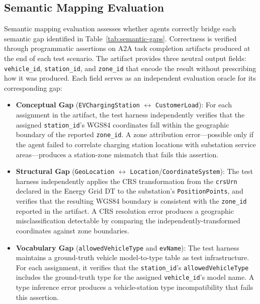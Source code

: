 \subsection{Semantic Mapping Evaluation}
\label{subsec:semantic-mapping-evaluation}

Semantic mapping evaluation assesses whether agents correctly bridge each semantic gap
    identified in Table~\ref{tab:semantic-gaps}.
Correctness is verified through programmatic assertions on A2A task completion artifacts
    produced at the end of each test scenario.
The artifact provides three neutral output fields: \texttt{vehicle\_id},
    \texttt{station\_id}, and \texttt{zone\_id} that encode the result
    without prescribing how it was produced.
Each field serves as an independent evaluation oracle for its corresponding gap:

\begin{itemize}
    \item \textbf{Conceptual Gap}
        (\texttt{EVChargingStation} $\leftrightarrow$ \texttt{CustomerLoad}):
    For each assignment in the artifact, the test harness independently verifies
        that the assigned \texttt{station\_id}'s WGS84 coordinates
        fall within the geographic boundary of the reported \texttt{zone\_id}.
    A zone attribution error---possible only if the agent failed to correlate
        charging station locations with substation service areas---produces
        a station-zone mismatch that fails this assertion.

    \item \textbf{Structural Gap}
        (\texttt{GeoLocation} $\leftrightarrow$ \texttt{Location}/\texttt{CoordinateSystem}):
    The test harness independently applies the CRS transformation from the
        \texttt{crsUrn} declared in the Energy Grid DT
        to the substation's \texttt{PositionPoints},
        and verifies that the resulting WGS84 boundary is consistent with
        the \texttt{zone\_id} reported in the artifact.
    A CRS resolution error produces a geographic misclassification
        detectable by comparing the independently-transformed coordinates
        against zone boundaries.

    \item \textbf{Vocabulary Gap}
        (\texttt{allowedVehicleType} and \texttt{evName}):
    The test harness maintains a ground-truth vehicle model-to-type table
        as test infrastructure.
    For each assignment, it verifies that the \texttt{station\_id}'s
        \texttt{allowedVehicleType} includes the ground-truth type
        for the assigned \texttt{vehicle\_id}'s model name.
    A type inference error produces a vehicle-station type incompatibility
        that fails this assertion.
\end{itemize}


